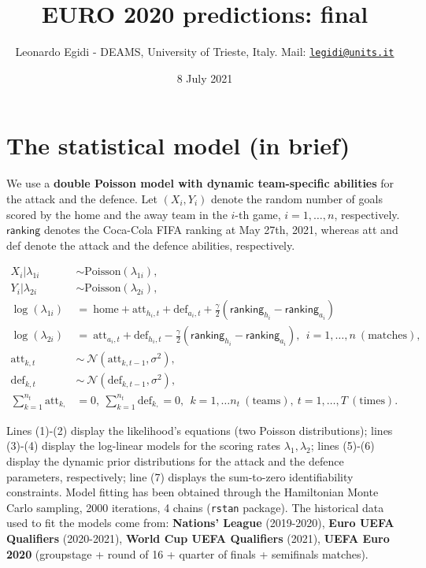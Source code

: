 \documentclass[
  10pt,
]{article}
\title{EURO 2020 predictions: final}
\author{Leonardo Egidi - DEAMS, University of Trieste, Italy. Mail:
\href{mailto:legidi@units.it}{\nolinkurl{legidi@units.it}}}
\date{8 July 2021}
\begin{document}
\maketitle

{
\setcounter{tocdepth}{2}
\tableofcontents
}
\hypertarget{the-statistical-model-in-brief}{%
\section{The statistical model (in
brief)}\label{the-statistical-model-in-brief}}

We use a \textbf{double Poisson model with dynamic team-specific
abilities} for the attack and the defence. Let \((X_{i}, Y_{i})\) denote
the random number of goals scored by the home and the away team in the
\(i\)-th game, \(i=1,\ldots,n\), respectively. \(\mathsf{ranking}\)
denotes the Coca-Cola FIFA ranking at May 27th, 2021, whereas att and
def denote the attack and the defence abilities, respectively.

\begin{align}
X_i| \lambda_{1i} &\sim \text{Poisson}(\lambda_{1i}),\\
Y_i|\lambda_{2i} &\sim \text{Poisson}(\lambda_{2i}),  \\
\log(\lambda_{1i}) &=\  \text{home} + \text{att}_{h_i, t}+ \text{def}_{a_i,t} + \frac{\gamma}{2}(\mathsf{ranking}_{h_i}-\mathsf{ranking}_{a_i}) \\
\log(\lambda_{2i}) & =\    \text{att}_{a_i,t} + \text{def}_{h_i,t} - \frac{\gamma}{2}(\mathsf{ranking}_{h_i}-\mathsf{ranking}_{a_i}), \ \ i=1,\ldots,n\ (\text{matches}), \\
\text{att}_{k, t} &\sim \ \mathcal{N}(\text{att}_{k, t-1}, \sigma^2), \\
\text{def}_{k, t} &\sim \  \mathcal{N}(\text{def}_{k, t-1}, \sigma^2),\\
\sum_{k=1}^{n_t} \text{att}_{k, }&=0, \  \sum_{k=1}^{n_t}\text{def}_{k, }=0, \ \ k=1,\ldots n_t \ (\text{teams}), \  t=1,\ldots, T \ (\text{times}).
\label{eq:scoring_rue}
\end{align}

Lines (1)-(2) display the likelihood's equations (two Poisson
distributions); lines (3)-(4) display the log-linear models for the
scoring rates \(\lambda_{1}, \lambda_{2}\); lines (5)-(6) display the
dynamic prior distributions for the attack and the defence parameters,
respectively; line (7) displays the sum-to-zero identifiability
constraints. Model fitting has been obtained through the Hamiltonian
Monte Carlo sampling, 2000 iterations, 4 chains (\texttt{rstan}
package). The historical data used to fit the models come from:
\textbf{Nations' League} (2019-2020), \textbf{Euro UEFA Qualifiers}
(2020-2021), \textbf{World Cup UEFA Qualifiers} (2021), \textbf{UEFA
Euro 2020} (groupstage + round of 16 + quarter of finals + semifinals
matches).
\end{document}
